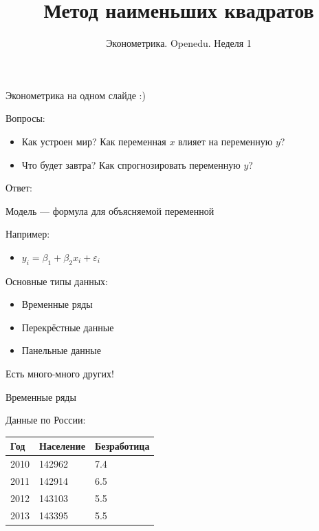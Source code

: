 \documentclass[russian,ignorenonframetext,]{beamer}
\author[Эконометрика. Неделя 1/15]{Эконометрика. Openedu. Неделя 1}
\title{Метод наименьших квадратов}
\date{}
\providecommand{\tightlist}{%
  \setlength{\itemsep}{0pt}\setlength{\parskip}{0pt}}
\begin{document}
\frame{\titlepage}

\begin{frame}{Эконометрика на одном слайде :)}

\begin{block}{Вопросы:}

\begin{itemize}
\tightlist
\item
  Как устроен мир? Как переменная \(x\) влияет на переменную \(y\)?
\item
  Что будет завтра? Как спрогнозировать переменную \(y\)?
\end{itemize}

\end{block}

\begin{block}{Ответ:}

Модель --- формула для объясняемой переменной

\end{block}

\begin{block}{Например:}

\begin{itemize}
\tightlist
\item
  \(y_i=\beta_1+\beta_2 x_i + \varepsilon_i\) 
\end{itemize}

\end{block}

\end{frame}

\begin{frame}{Основные типы данных:}

\begin{itemize}
\tightlist
\item
  Временные ряды
\item
  Перекрёстные данные
\item
  Панельные данные
\end{itemize}

Есть много-много других!

\end{frame}

\begin{frame}{Временные ряды}

Данные по России:

\begin{longtable}[c]{@{}lll@{}}
\toprule
Год & Население & Безработица\tabularnewline
\midrule
\endhead
2010 & 142962 & 7.4\tabularnewline
2011 & 142914 & 6.5\tabularnewline
2012 & 143103 & 5.5\tabularnewline
2013 & 143395 & 5.5\tabularnewline
\bottomrule
\end{longtable}

\end{frame}
\end{document}
